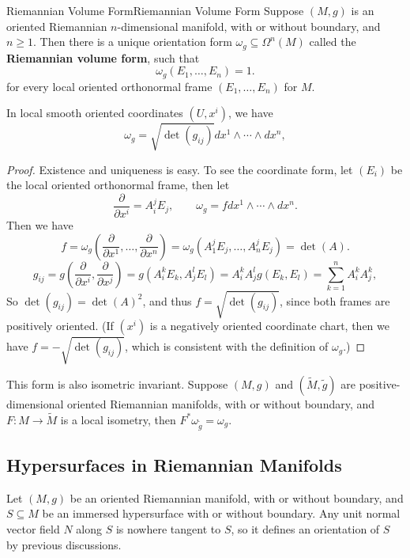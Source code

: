 \documentclass[../main.tex]{subfiles}
\begin{document}
\begin{proposition}{Riemannian Volume Form}{Riemannian Volume Form}
  Suppose $(M,g)$ is an oriented Riemannian $n$-dimensional manifold, with or without boundary, and $n \geq 1$. Then there is a unique orientation form $\omega_g \subseteq \Omega^n(M)$ called the \textbf{Riemannian volume form}, such that
  \begin{equation}
    \omega_g(E_1, \ldots , E_n) = 1.
  \end{equation}
  for every local oriented orthonormal frame $(E_1, \ldots , E_n)$ for $M$.

  In local smooth oriented coordinates $(U, x^i)$, we have
  \begin{equation}
    \omega_g = \sqrt{\det(g_{ij})} dx^1 \wedge \cdots \wedge dx^n,
  \end{equation}
\end{proposition}
\begin{proof}
  Existence and uniqueness is easy. To see the coordinate form, let $(E_i)$ be the local oriented orthonormal frame, then let
  \begin{equation*}
    \frac{\partial}{\partial x^i} = A_i^j E_j, \qquad \omega_g = f dx^1 \wedge \cdots \wedge dx^n.
  \end{equation*}
  Then we have
  \begin{equation*}
    f = \omega_g\left( \frac{\partial}{\partial x^1}, \ldots , \frac{\partial}{\partial x^n} \right) = \omega_g(A_1^j E_j, \ldots , A_n^j E_j) = \det(A).
  \end{equation*}
  \begin{equation*}
    g_{ij} = g\left( \frac{\partial}{\partial x^i}, \frac{\partial}{\partial x^j} \right) = g(A_i^k E_k, A_j^l E_l) = A_i^k A_j^l g(E_k, E_l) = \sum_{k=1}^n A_i^k A_j^k,
  \end{equation*}
  So $\det(g_{ij}) = \det(A)^2$, and thus $f = \sqrt{\det(g_{ij})}$, since both frames are positively oriented. (If $(x^i)$ is a negatively oriented coordinate chart, then we have $f = -\sqrt{\det(g_{ij})}$, which is consistent with the definition of $\omega_g$.)
\end{proof}

This form is also isometric invariant. Suppose $(M, g)$ and $(\tilde{M}, \tilde{g})$ are positive-dimensional oriented Riemannian manifolds, with or without boundary, and $F: M \to \tilde{M}$ is a local isometry, then $F^* \omega_{\tilde{g}} = \omega_g$.

\subsection{Hypersurfaces in Riemannian Manifolds}
Let $(M,g)$ be an oriented Riemannian manifold, with or without boundary, and $S \subseteq M$ be an immersed hypersurface with or without boundary. Any unit normal vector field $N$ along $S$ is nowhere tangent to $S$, so it defines an orientation of $S$ by previous discussions.
\end{document}
